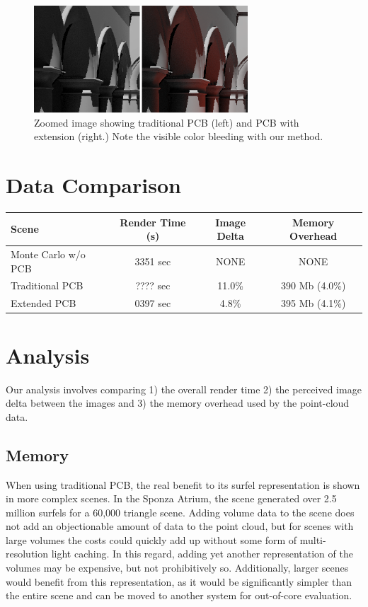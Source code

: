 \documentclass[12pt]{ucthesis}
\begin{document}
\begin{figure}[h!]
    \centering
    \includegraphics[width=80mm]{img/compare_trad_corrected.png}
    \caption{Zoomed image showing traditional PCB (left) and PCB with extension (right.)  Note the visible color bleeding with our method.}
    \label{fig:compare_trad}
\end{figure}


\section{Data Comparison}

\begin{center}
\setlength{\tabcolsep}{5pt}
\begin{tabular}{ | l | c | c | c | }
  \hline                       
  Scene & Render Time (s) & Image Delta & Memory Overhead \\
  \hline                  
  Monte Carlo w/o PCB & 3351 sec & NONE & NONE \\
  Traditional PCB & ???? sec & 11.0\% & 390 Mb (4.0\%) \\
  Extended PCB & 0397 sec & 4.8\% & 395 Mb (4.1\%)  \\
  \hline  
\end{tabular}
\end{center}


\section{Analysis}
Our analysis involves comparing 1) the overall render time 2) the perceived image delta between the images and 3) the memory overhead used by the point-cloud data.

\subsection{Memory}
When using traditional PCB, the real benefit to its surfel representation is shown in more complex scenes.  In the Sponza Atrium, the scene generated over 2.5 million surfels for a 60,000 triangle scene.  Adding volume data to the scene does not add an objectionable amount of data to the point cloud, but for scenes with large volumes the costs could quickly add up without some form of multi-resolution light caching.  In this regard, adding yet another representation of the volumes may be expensive, but not prohibitively so.  Additionally, larger scenes would benefit from this representation, as it would be significantly simpler than the entire scene and can be moved to another system for out-of-core evaluation.
\end{document}
